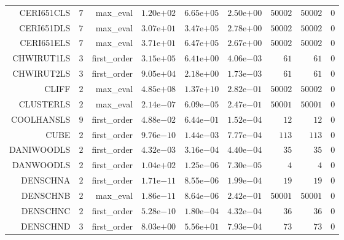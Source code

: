 \begin{longtable}{rrrrrrrrr}
CERI651CLS & \(     7\) & max\_eval & \( 1.20\)e\(+02\) & \( 6.65\)e\(+05\) & \( 2.50\)e\(+00\) & \( 50002\) & \( 50002\) & \(     0\) \\
CERI651DLS & \(     7\) & max\_eval & \( 3.07\)e\(+01\) & \( 3.47\)e\(+05\) & \( 2.78\)e\(+00\) & \( 50002\) & \( 50002\) & \(     0\) \\
CERI651ELS & \(     7\) & max\_eval & \( 3.71\)e\(+01\) & \( 6.47\)e\(+05\) & \( 2.67\)e\(+00\) & \( 50002\) & \( 50002\) & \(     0\) \\
CHWIRUT1LS & \(     3\) & first\_order & \( 3.15\)e\(+05\) & \( 6.41\)e\(+00\) & \( 4.06\)e\(-03\) & \(    61\) & \(    61\) & \(     0\) \\
CHWIRUT2LS & \(     3\) & first\_order & \( 9.05\)e\(+04\) & \( 2.18\)e\(+00\) & \( 1.73\)e\(-03\) & \(    61\) & \(    61\) & \(     0\) \\
CLIFF & \(     2\) & max\_eval & \( 4.85\)e\(+08\) & \( 1.37\)e\(+10\) & \( 2.82\)e\(-01\) & \( 50002\) & \( 50002\) & \(     0\) \\
CLUSTERLS & \(     2\) & max\_eval & \( 2.14\)e\(-07\) & \( 6.09\)e\(-05\) & \( 2.47\)e\(-01\) & \( 50001\) & \( 50001\) & \(     0\) \\
COOLHANSLS & \(     9\) & first\_order & \( 4.88\)e\(-02\) & \( 6.44\)e\(-01\) & \( 1.52\)e\(-04\) & \(    12\) & \(    12\) & \(     0\) \\
CUBE & \(     2\) & first\_order & \( 9.76\)e\(-10\) & \( 1.44\)e\(-03\) & \( 7.77\)e\(-04\) & \(   113\) & \(   113\) & \(     0\) \\
DANIWOODLS & \(     2\) & first\_order & \( 4.32\)e\(-03\) & \( 3.16\)e\(-04\) & \( 4.40\)e\(-04\) & \(    35\) & \(    35\) & \(     0\) \\
DANWOODLS & \(     2\) & first\_order & \( 1.04\)e\(+02\) & \( 1.25\)e\(-06\) & \( 7.30\)e\(-05\) & \(     4\) & \(     4\) & \(     0\) \\
DENSCHNA & \(     2\) & first\_order & \( 1.71\)e\(-11\) & \( 8.55\)e\(-06\) & \( 1.99\)e\(-04\) & \(    19\) & \(    19\) & \(     0\) \\
DENSCHNB & \(     2\) & max\_eval & \( 1.86\)e\(-11\) & \( 8.64\)e\(-06\) & \( 2.42\)e\(-01\) & \( 50001\) & \( 50001\) & \(     0\) \\
DENSCHNC & \(     2\) & first\_order & \( 5.28\)e\(-10\) & \( 1.80\)e\(-04\) & \( 4.32\)e\(-04\) & \(    36\) & \(    36\) & \(     0\) \\
DENSCHND & \(     3\) & first\_order & \( 8.03\)e\(+00\) & \( 5.56\)e\(+01\) & \( 7.93\)e\(-04\) & \(    73\) & \(    73\) & \(     0\) \\

\end{longtable}
